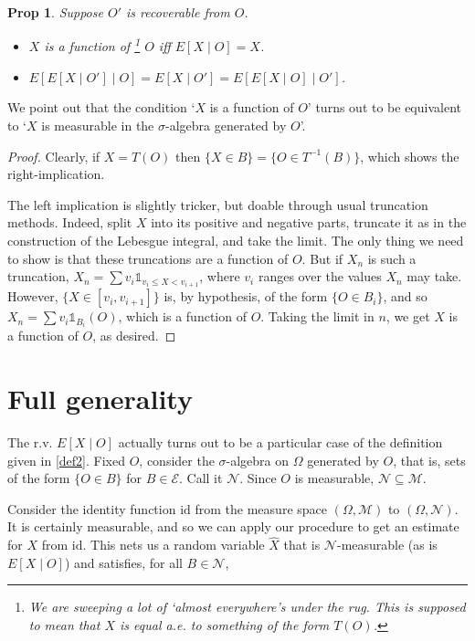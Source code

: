 \documentclass{article}
\let\mathbbalt\mathbb
\let\mathbbu\mathbb
\let\mathbb\mathbbalt
\newcommand{\M}{\mathcal{M}}
\newcommand{\N}{\mathcal{N}}
\newcommand{\E}{\mathcal{E}}
\newcommand{\id}{\mathrm{id}}
\newcommand{\ind}{\mathbbu{1}}
\newtheorem{prop}{Prop}
\begin{document}
	\begin{prop}
	Suppose $O'$ is recoverable from $O$.
	
	\begin{itemize}
	\item $X$ is a function of \footnote{We are sweeping a lot of `almost everywhere's under the rug. This is supposed to mean that $X$ is equal a.e. to something of the form $T(O)$.} $O$ iff $E[X \mid O] = X$.
	
	\item $E[E[X \mid O'] \mid O] = E[X \mid O'] = E[E[X \mid O] \mid O']$.
	\end{itemize}
	
	\end{prop}
	
	We point out that the condition `$X$ is a function of $O$' turns out to be equivalent to `$X$ is measurable in the $\sigma$-algebra generated by $O$'.
	
	\begin{proof}
	Clearly, if $X = T(O)$ then $\{X \in B\} = \{O \in T^{-1}(B)\}$, which shows the right-implication.
	
	The left implication is slightly tricker, but doable through usual truncation methods. Indeed, split $X$ into its positive and negative parts, truncate it as in the construction of the Lebesgue integral, and take the limit. The only thing we need to show is that these truncations are a function of $O$. But if $X_n$ is such a truncation, $X_n = \sum v_i \ind_{v_i \leq X < v_{i+1}}$, where $v_i$ ranges over the values $X_n$ may take. However, $\{X \in \left[v_i, v_{i+1}\right]\}$ is, by hypothesis, of the form $\{O \in B_i\}$, and so $X_n = \sum v_i \ind_{B_i}(O)$, which is a function of $O$. Taking the limit in $n$, we get $X$ is a function of $O$, as desired.
	\end{proof}
	
	\section{Full generality}
	
	The r.v. $E[X \mid O]$ actually turns out to be a particular case of the definition given in \eqref{def2}. Fixed $O$, consider the $\sigma$-algebra on $\Omega$ generated by $O$, that is, sets of the form $\{O \in B\}$ for $B \in \E$. Call it $\N$. Since $O$ is measurable, $\N \subseteq \M$.
	
	Consider the identity function $\id$ from the measure space $(\Omega, \M)$ to $(\Omega, \N)$. It is certainly measurable, and so we can apply our procedure to get an estimate for $X$ from $\id$. This nets us a random variable $\hat X$ that is $\N$-measurable (as is $E[X \mid O]$) and satisfies, for all $B \in \N$,
	
\end{document}

